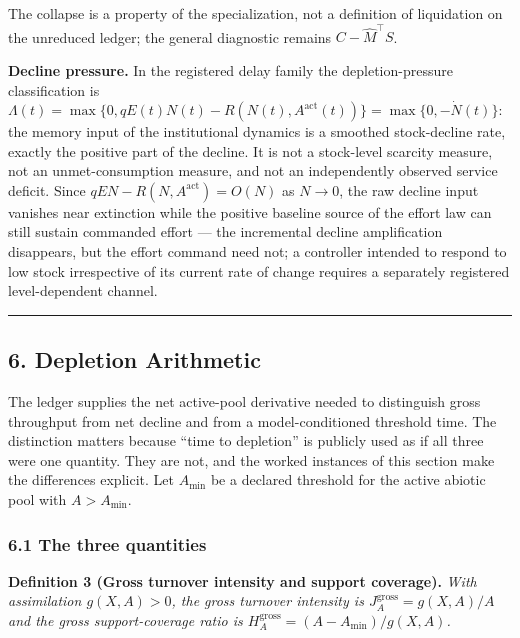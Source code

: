 \documentclass[11pt]{article}
\begin{document}
The collapse is a property of the specialization, not a definition of
liquidation on the unreduced ledger; the general diagnostic remains
\(C - \widehat{M}^\top S\).

\textbf{Decline pressure.} In the registered delay family the
depletion-pressure classification is
\(\Lambda(t) = \max\{0, qE(t)N(t) - R(N(t), A^{\mathrm{act}}(t))\} = \max\{0, -\dot N(t)\}\):
the memory input of the institutional dynamics is a smoothed
stock-decline rate, exactly the positive part of the decline. It is not
a stock-level scarcity measure, not an unmet-consumption measure, and
not an independently observed service deficit. Since
\(qEN - R(N, A^{\mathrm{act}}) = O(N)\) as \(N \to 0\), the raw decline
input vanishes near extinction while the positive baseline source of the
effort law can still sustain commanded effort --- the incremental
decline amplification disappears, but the effort command need not; a
controller intended to respond to low stock irrespective of its current
rate of change requires a separately registered level-dependent channel.

\begin{center}\rule{0.5\linewidth}{0.5pt}\end{center}

\subsection{6. Depletion Arithmetic}\label{depletion-arithmetic}

The ledger supplies the net active-pool derivative needed to distinguish
gross throughput from net decline and from a model-conditioned threshold
time. The distinction matters because ``time to depletion'' is publicly
used as if all three were one quantity. They are not, and the worked
instances of this section make the differences explicit. Let
\(A_{\min}\) be a declared threshold for the active abiotic pool with
\(A > A_{\min}\).

\subsubsection{6.1 The three quantities}\label{the-three-quantities}

\textbf{Definition 3 (Gross turnover intensity and support coverage).}
\emph{With assimilation \(g(X,A) > 0\), the gross turnover intensity is
\(J_A^{\mathrm{gross}} = g(X,A)/A\) and the gross support-coverage ratio
is \(H_A^{\mathrm{gross}} = (A - A_{\min})/g(X,A)\).}
\end{document}
